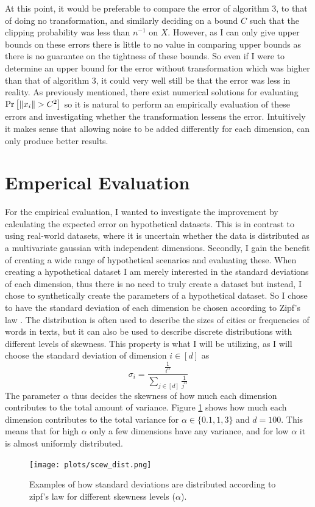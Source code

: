 \documentclass[a4paper,12pt]{article}
\begin{document}
At this point, it would be preferable to compare the error of algorithm 3, to that of doing no transformation, and similarly deciding on a bound $C$ 
such that the clipping probability was less than $n^{-1}$ on $X$. However, as I can only give upper bounds on these errors there is little to no value in comparing 
upper bounds as there is no guarantee on the tightness of these bounds. So even if I were to determine an upper bound for the error without transformation which was higher than that of algorithm 3, 
it could very well still be that the error was less in reality.
As previously mentioned, there exist numerical solutions for evaluating $\Pr\left [\|x_i\| > C^2 \right]$ so it is natural to perform an empirically evaluation of these errors
 and investigating whether the transformation lessens the error.
Intuitively it makes sense that allowing noise to be added differently for each dimension, can only produce better results.

\section{Emperical Evaluation}
\label{sec:emperical}
For the empirical evaluation, I wanted to investigate the 
improvement by calculating the expected error on hypothetical datasets. 
This is in contrast to using real-world datasets, where it is uncertain whether
the data is distributed as a multivariate gaussian with independent dimensions.
Secondly, I gain the benefit of creating a wide range of hypothetical scenarios and evaluating these.
When creating a hypothetical dataset I am merely interested in the standard deviations of each dimension,
thus there is no need to truly create a dataset but instead, I chose to 
synthetically create the parameters of a hypothetical dataset.
So I chose to have the standard deviation of each dimension be chosen according 
to Zipf's law \cite{zipf}. The distribution is often used to describe 
the sizes of cities or frequencies of words in texts, but it can also be used to 
describe discrete distributions with different levels of skewness. 
This property is what I will be utilizing, as I will choose the 
standard deviation of dimension $i \in [d]$ as
\[
    \sigma_i = \frac{ \frac{1}{i^\alpha}}{\sum_{j \in [d]} \frac{1}{j^\alpha}}
\]
The parameter $\alpha$ thus decides the skewness of how much each dimension contributes to the total amount of variance.
Figure \ref{fig:skew} shows how much each dimension contributes to the total variance for
$\alpha \in \{0.1,1,3\}$ and $d = 100$. This means that for high $\alpha$ only a few dimensions have any variance, 
and for low $\alpha$ it is almost uniformly distributed.
\begin{figure}[h!]
\label{fig:skew}
\texttt{[image: plots/scew\_dist.png]}
\caption{Examples of how standard deviations are distributed according to 
zipf's law for different skewness levels ($\alpha$).} 
\end{figure}
\end{document}

